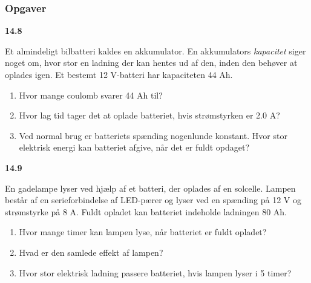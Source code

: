 \documentclass[11pt]{article}
\begin{document}
\subsubsection*{Opgaver}
\label{sec:org8818421}
\textbf{14.8}

Et almindeligt bilbatteri kaldes en akkumulator. En akkumulators \emph{kapacitet} siger noget om, hvor stor en ladning der kan hentes ud af den, inden den behøver at oplades igen. Et bestemt 12 V-batteri har kapaciteten 44 Ah.

\begin{enumerate}
\item Hvor mange coulomb svarer 44 Ah til?
\item Hvor lag tid tager det at oplade batteriet, hvis strømstyrken er 2.0 A?
\item Ved normal brug er batteriets spænding nogenlunde konstant. Hvor stor elektrisk energi kan batteriet afgive, når det er fuldt opdaget?
\end{enumerate}
\textbf{14.9}

En gadelampe lyser ved hjælp af et batteri, der oplades af en solcelle. Lampen består af en serieforbindelse af LED-pærer og lyser ved en spænding på 12 V og strømstyrke på 8 A. Fuldt opladet kan batteriet indeholde ladningen 80 Ah.

\begin{enumerate}
\item Hvor mange timer kan lampen lyse, når batteriet er fuldt opladet?
\item Hvad er den samlede effekt af lampen?
\item Hvor stor elektrisk ladning passere batteriet, hvis lampen lyser i 5 timer?
\end{enumerate}
\end{document}
